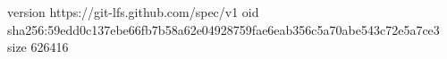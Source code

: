 version https://git-lfs.github.com/spec/v1
oid sha256:59edd0c137ebe66fb7b58a62e04928759fae6eab356c5a70abe543c72e5a7ce3
size 626416
